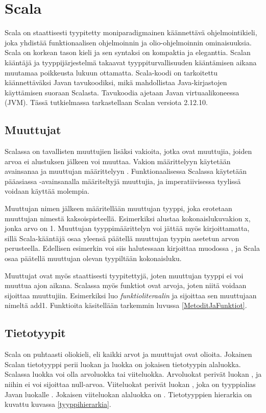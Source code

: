 \chapter{Scala} \label{Scala}
Scala on staattisesti tyypitetty moniparadigmainen käännettävä ohjelmointikieli, joka yhdistää funktionaalisen ohjelmoinnin ja olio-ohjelmoinnin ominaisuuksia. Scala on korkean tason kieli ja sen syntaksi on kompaktia ja eleganttia. Scalan kääntäjä ja tyyppijärjestelmä takaavat tyyppiturvallisuuden kääntämisen aikana muutamaa poikkeusta lukuun ottamatta. Scala-koodi on tarkoitettu käännettäväksi Javan tavukoodiksi, mikä mahdollistaa Java-kirjastojen käyttämisen suoraan Scalasta. Tavukoodia ajetaan Javan virtuaalikoneessa (JVM). Tässä tutkielmassa tarkastellaan Scalan versiota 2.12.10.
\cite[Introduction]{tourOfScala}
\cite[Luku 2]{prorgrammingInScala3rd}


\section{Muuttujat} \label{Muuttujat}
Scalassa on tavallisten muuttujien lisäksi vakioita, jotka ovat muuttujia, joiden arvoa ei alustuksen jälkeen voi muuttaa. Vakion määrittelyyn käytetään avainsanaa  ja muuttujan määrittelyyn . Funktionaalisessa Scalassa käytetään pääasiassa -avainsanalla määriteltyjä muuttujia, ja imperatiivisessa tyylissä voidaan käyttää molempia.

Muuttujan nimen jälkeen määritellään muuttujan tyyppi, joka erotetaan muuttujan nimestä kaksoispisteellä. Esimerkiksi  alustaa kokonaislukuvakion x, jonka arvo on 1. Muuttujan tyyppimäärittelyn voi jättää myös kirjoittamatta, sillä Scala-kääntäjä osaa yleensä päätellä muuttujan tyypin asetetun arvon perusteella. Edellisen esimerkin voi siis halutessaan kirjoittaa muodossa , ja Scala osaa päätellä muuttujan olevan tyypiltään kokonaisluku.
\cite[Basics]{tourOfScala}

Muuttujat ovat myös staattisesti tyypitettyjä, joten muuttujan tyyppi ei voi muuttua ajon aikana. Scalassa myös funktiot ovat arvoja, joten niitä voidaan sijoittaa muuttujiin. Esimerkiksi  luo \textit{funktioliteraalin} ja sijoittaa sen muuttujaan nimeltä add1. Funktioita käsitellään tarkemmin luvussa \ref{MetoditJaFunktiot}.
\cite[Luku 1]{prorgrammingInScala3rd}


\section{Tietotyypit}
Scala on puhtaasti oliokieli, eli kaikki arvot ja muuttujat ovat olioita. Jokainen Scalan tietotyyppi perii luokan  ja luokka  on jokaisen tietotyypin alaluokka. Scalassa luokka voi olla arvoluokka tai viiteluokka. Arvoluokat perivät luokan , ja niihin ei voi sijoittaa null-arvoa. Viiteluokat perivät luokan , joka on tyyppialias Javan luokalle . Jokaisen viiteluokan alaluokka on . Tietotyyppien hierarkia on kuvattu kuvassa \ref{tyyppihierarkia}.
\cite[Luku 5]{prorgrammingInScala3rd}

